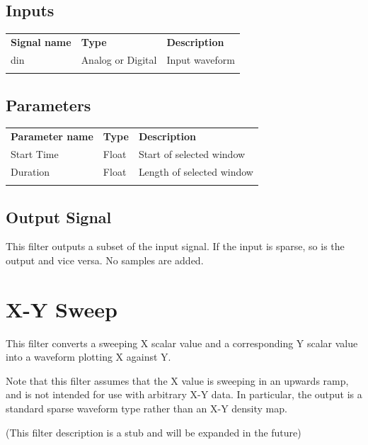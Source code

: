 \subsection{Inputs}

\begin{tabularx}{16cm}{llX}
\thickhline
\textbf{Signal name} & \textbf{Type} & \textbf{Description} \\
\thickhline
din & Analog or Digital & Input waveform \\
\thickhline
\end{tabularx}

\subsection{Parameters}

\begin{tabularx}{16cm}{llX}
\thickhline
\textbf{Parameter name} & \textbf{Type} & \textbf{Description} \\
\thickhline
Start Time & Float & Start of selected window \\
\thinhline
Duration & Float & Length of selected window \\
\thickhline
\end{tabularx}

\subsection{Output Signal}

This filter outputs a subset of the input signal. If the input is sparse, so is the output and vice versa. No samples
are added.

\pagebreak
\section{X-Y Sweep}

This filter converts a sweeping X scalar value and a corresponding Y scalar value into a waveform plotting X against Y.

Note that this filter assumes that the X value is sweeping in an upwards ramp, and is not intended for use with
arbitrary X-Y data. In particular, the output is a standard sparse waveform type rather than an X-Y density map.

(This filter description is a stub and will be expanded in the future)
